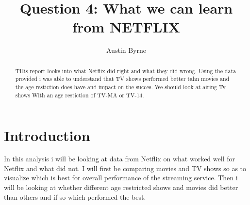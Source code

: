 \documentclass[11pt,preprint, authoryear]{elsarticle}
\numberwithin{equation}{section}
\numberwithin{figure}{section}
\numberwithin{table}{section}
\begin{document}
\begin{frontmatter}  %

\title{Question 4: What we can learn from NETFLIX}





\author[Add1]{Austin Byrne}





\address[Add1]{The best Quantitative analyst, Stellenbosch, South
Africa}


\begin{abstract}
\small{
THis report looks into what Netflix did right and what they did wrong.
Using the data provided i was able to understand that TV shows performed
better tahn movies and the age restiction does have and impact on the
succes. We should look at airing Tv shows With an age restiction of
TV-MA or TV-14.
}
\end{abstract}

\vspace{1cm}





\vspace{0.5cm}

\end{frontmatter}

\setcounter{footnote}{0}



\pagestyle{fancy}
\chead{}
\rhead{}
\lfoot{}
\lhead{}
\cfoot{}


\headsep 35pt %




\hypertarget{introduction}{%
\section{\texorpdfstring{Introduction
\label{Introduction}}{Introduction }}\label{introduction}}

In this analysis i will be looking at data from Netflix on what worked
well for Netflix and what did not. I will first be comparing movies and
TV shows so as to visualize which is best for overall performance of the
streaming service. Then i will be looking at whether different age
restricted shows and movies did better than others and if so which
performed the best.
\end{document}
